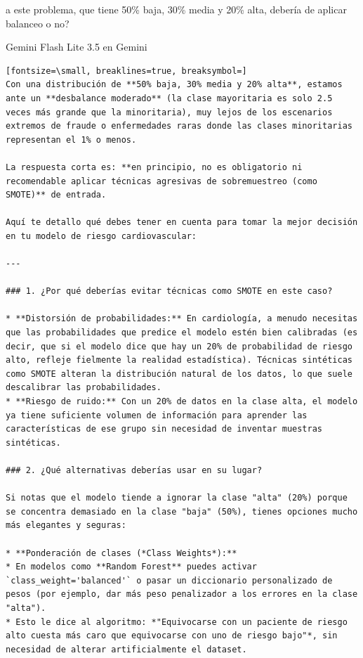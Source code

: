 \documentclass[12pt,a4paper,oneside]{book}
\begin{document}
\begin{iaprompt}
a este problema, que tiene 50\% baja, 30\% media y 20\% alta, debería de aplicar balanceo o no?
\end{iaprompt}
\begin{iaresp}{Gemini Flash Lite 3.5 en Gemini}
\begin{Verbatim}[fontsize=\small, breaklines=true, breaksymbol=]
Con una distribución de **50% baja, 30% media y 20% alta**, estamos ante un **desbalance moderado** (la clase mayoritaria es solo 2.5 veces más grande que la minoritaria), muy lejos de los escenarios extremos de fraude o enfermedades raras donde las clases minoritarias representan el 1% o menos.

La respuesta corta es: **en principio, no es obligatorio ni recomendable aplicar técnicas agresivas de sobremuestreo (como SMOTE)** de entrada.

Aquí te detallo qué debes tener en cuenta para tomar la mejor decisión en tu modelo de riesgo cardiovascular:

---

### 1. ¿Por qué deberías evitar técnicas como SMOTE en este caso?

* **Distorsión de probabilidades:** En cardiología, a menudo necesitas que las probabilidades que predice el modelo estén bien calibradas (es decir, que si el modelo dice que hay un 20% de probabilidad de riesgo alto, refleje fielmente la realidad estadística). Técnicas sintéticas como SMOTE alteran la distribución natural de los datos, lo que suele descalibrar las probabilidades.
* **Riesgo de ruido:** Con un 20% de datos en la clase alta, el modelo ya tiene suficiente volumen de información para aprender las características de ese grupo sin necesidad de inventar muestras sintéticas.

### 2. ¿Qué alternativas deberías usar en su lugar?

Si notas que el modelo tiende a ignorar la clase "alta" (20%) porque se concentra demasiado en la clase "baja" (50%), tienes opciones mucho más elegantes y seguras:

* **Ponderación de clases (*Class Weights*):**
* En modelos como **Random Forest** puedes activar `class_weight='balanced'` o pasar un diccionario personalizado de pesos (por ejemplo, dar más peso penalizador a los errores en la clase "alta").
* Esto le dice al algoritmo: *"Equivocarse con un paciente de riesgo alto cuesta más caro que equivocarse con uno de riesgo bajo"*, sin necesidad de alterar artificialmente el dataset.



\end{Verbatim}
\end{iaresp}
\end{document}
